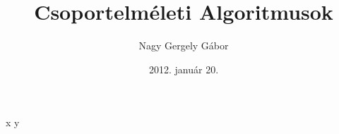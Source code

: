 \documentclass{beamer}
\begin{document}
\title[Csoportelméleti Algoritmusok]{Csoportelméleti Algoritmusok}
\author{Nagy Gergely Gábor}
\date{2012. január 20.}

\begin{frame}
\titlepage
\end{frame}

\begin{frame}
x
\pause
y
\end{frame}
\end{document}
